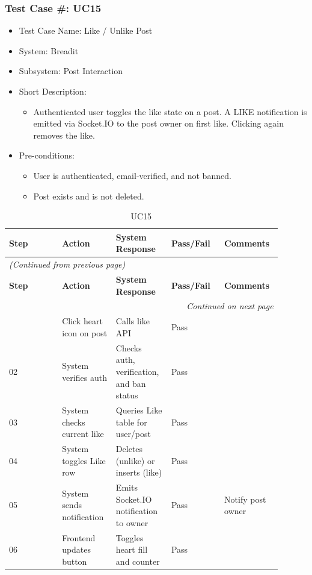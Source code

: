 \subsubsection{Test Case \#: UC15}
\begin{itemize}
  \item Test Case Name: Like / Unlike Post
  \item System: Breadit
  \item Subsystem: Post Interaction
  \item Short Description:
\begin{itemize}
  \item Authenticated user toggles the like state on a post. A LIKE notification is emitted via Socket.IO to the post owner on first like. Clicking again removes the like.
\end{itemize}
  \item Pre-conditions:
\begin{itemize}
  \item User is authenticated, email-verified, and not banned.
  \item Post exists and is not deleted.
\end{itemize}
\end{itemize}

\begin{longtable}{|p{0.18\linewidth}|p{0.18\linewidth}|p{0.18\linewidth}|p{0.18\linewidth}|p{0.18\linewidth}|}
\caption{UC15} \label{tab:34} \\
\hline
\textbf{Step} & \textbf{Action} & \textbf{System Response} & \textbf{Pass/Fail} & \textbf{Comments} \\
\hline
\endfirsthead
\multicolumn{5}{l}{\textit{(Continued from previous page)}} \\
\hline
\textbf{Step} & \textbf{Action} & \textbf{System Response} & \textbf{Pass/Fail} & \textbf{Comments} \\
\hline
\endhead
\hline \multicolumn{5}{r}{\textit{Continued on next page}} \\
\endfoot
\hline
\endlastfoot
01 & Click heart icon on post & Calls like API & Pass &  \\
\hline
02 & System verifies auth & Checks auth, verification, and ban status & Pass &  \\
\hline
03 & System checks current like & Queries Like table for user/post & Pass &  \\
\hline
04 & System toggles Like row & Deletes (unlike) or inserts (like) & Pass &  \\
\hline
05 & System sends notification & Emits Socket.IO notification to owner & Pass & Notify post owner \\
\hline
06 & Frontend updates button & Toggles heart fill and counter & Pass &  \\
\hline
\end{longtable}

